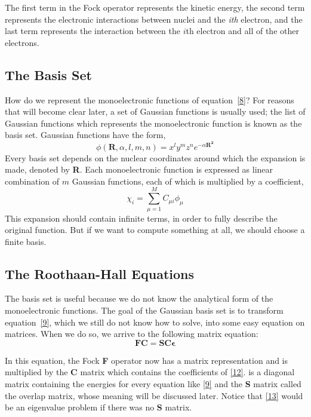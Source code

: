 \documentclass{tmr}
\begin{document}
The first term in the Fock operator represents the kinetic energy, the second term
represents the electronic interactions between nuclei and the \textit{ith} electron, and the last term
represents the interaction between the $i$th electron and all of the other electrons.

\subsection{The Basis Set}
How do we represent the monoelectronic functions of equation~\eqref{8}?
For reasons that will become clear later, a set of Gaussian
functions is usually used; the list of Gaussian functions which represents
the monoelectronic function is known as the basis set. Gaussian
functions have the form,
\begin{equation}\label{11}
\phi(\mathbf{R},\alpha,l,m,n) = x^{l}y^{m}z^{n} e^{-\alpha\mathbf{R^{2}}}
\end{equation}
Every basis set depends on the nuclear coordinates around
which the expansion is made, denoted by \textbf{R}. Each monoelectronic 
function is expressed as linear combination of $m$ Gaussian 
functions, each of which is multiplied by a coefficient,
\begin{equation}\label{12}
\chi_{i} = \sum_{\mu = 1}^{M} C_{\mu i} \phi_{\mu}
\end{equation}
This expansion should contain infinite terms, in order to 
fully describe the original function. But if we
want to compute something at all, we should choose a finite basis.

\subsection{The Roothaan-Hall Equations}
The basis set is useful because we do not know the analytical form of the monoelectronic functions.
The goal of the Gaussian basis set is to transform equation~\eqref{9}, which we still do not know 
how to solve, into some easy equation on matrices. When we do so, we arrive to the following matrix equation:
\begin{equation}\label{13}
\mathbf{FC} = \mathbf{SC\epsilon}
\end{equation}

In this equation, the Fock \textbf{F} operator now has a matrix representation and is multiplied by
the \textbf{C} matrix which contains the coefficients of \eqref{12}. \textbf{\textepsilon}
is a diagonal matrix containing the energies for every equation like \eqref{9} and
the \textbf{S} matrix called the overlap matrix, whose meaning will be discussed later. Notice
that \eqref{13} would be an eigenvalue problem if there was no \textbf{S} matrix.
\end{document}
